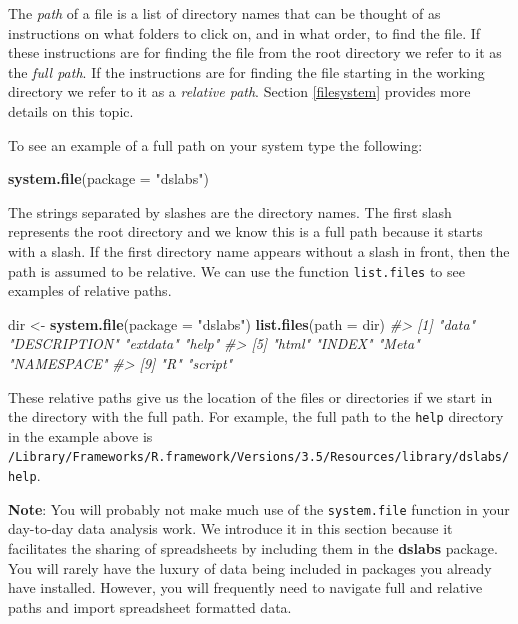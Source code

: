 \documentclass[
]{krantz}
\newenvironment{Shaded}{\begin{snugshade}}{\end{snugshade}}
\newcommand{\CommentTok}[1]{\textcolor[rgb]{0.37,0.37,0.37}{\textit{#1}}}
\newcommand{\DataTypeTok}[1]{\textcolor[rgb]{0.27,0.27,0.27}{#1}}
\newcommand{\KeywordTok}[1]{\textcolor[rgb]{0.27,0.27,0.27}{\textbf{#1}}}
\newcommand{\NormalTok}[1]{#1}
\newcommand{\StringTok}[1]{\textcolor[rgb]{0.5,0.5,0.5}{#1}}
\begin{document}
The \emph{path} of a file is a list of directory names that can be thought of as instructions on what folders to click on, and in what order, to find the file. If these instructions are for finding the file from the root directory we refer to it as the \emph{full path}. If the instructions are for finding the file starting in the working directory we refer to it as a \emph{relative path}. Section \ref{filesystem} provides more details on this topic.

To see an example of a full path on your system type the following:

\begin{Shaded}
\begin{Highlighting}[]
\KeywordTok{system.file}\NormalTok{(}\DataTypeTok{package =} \StringTok{"dslabs"}\NormalTok{)}
\end{Highlighting}
\end{Shaded}

The strings separated by slashes are the directory names. The first slash represents the root directory and we know this is a full path because it starts with a slash. If the first directory name appears without a slash in front, then the path is assumed to be relative. We can use the function \texttt{list.files} to see examples of relative paths.

\begin{Shaded}
\begin{Highlighting}[]
\NormalTok{dir <-}\StringTok{ }\KeywordTok{system.file}\NormalTok{(}\DataTypeTok{package =} \StringTok{"dslabs"}\NormalTok{)}
\KeywordTok{list.files}\NormalTok{(}\DataTypeTok{path =}\NormalTok{ dir)}
\CommentTok{#>  [1] "data"        "DESCRIPTION" "extdata"     "help"       }
\CommentTok{#>  [5] "html"        "INDEX"       "Meta"        "NAMESPACE"  }
\CommentTok{#>  [9] "R"           "script"}
\end{Highlighting}
\end{Shaded}

These relative paths give us the location of the files or directories if we start in the directory with the full path. For example, the full path to the \texttt{help} directory in the example above is \texttt{/Library/Frameworks/R.framework/Versions/3.5/Resources/library/dslabs/help}.

\textbf{Note}: You will probably not make much use of the \texttt{system.file} function in your day-to-day data analysis work. We introduce it in this section because it facilitates the sharing of spreadsheets by including them in the \textbf{dslabs} package. You will rarely have the luxury of data being included in packages you already have installed. However, you will frequently need to navigate full and relative paths and import spreadsheet formatted data.
\end{document}
